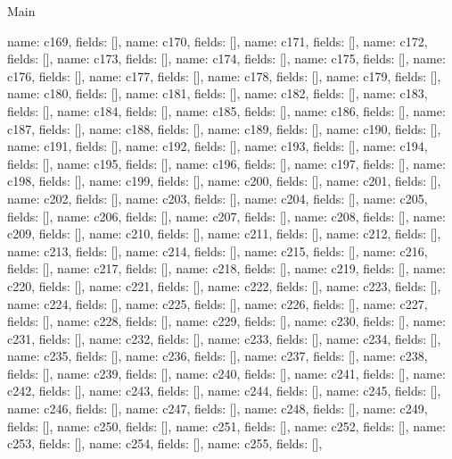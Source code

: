 \begin{lexlean}{Main}
\begin{semanticmodule}
{    {name: c169, fields: []},
    {name: c170, fields: []},
    {name: c171, fields: []},
    {name: c172, fields: []},
    {name: c173, fields: []},
    {name: c174, fields: []},
    {name: c175, fields: []},
    {name: c176, fields: []},
    {name: c177, fields: []},
    {name: c178, fields: []},
    {name: c179, fields: []},
    {name: c180, fields: []},
    {name: c181, fields: []},
    {name: c182, fields: []},
    {name: c183, fields: []},
    {name: c184, fields: []},
    {name: c185, fields: []},
    {name: c186, fields: []},
    {name: c187, fields: []},
    {name: c188, fields: []},
    {name: c189, fields: []},
    {name: c190, fields: []},
    {name: c191, fields: []},
    {name: c192, fields: []},
    {name: c193, fields: []},
    {name: c194, fields: []},
    {name: c195, fields: []},
    {name: c196, fields: []},
    {name: c197, fields: []},
    {name: c198, fields: []},
    {name: c199, fields: []},
    {name: c200, fields: []},
    {name: c201, fields: []},
    {name: c202, fields: []},
    {name: c203, fields: []},
    {name: c204, fields: []},
    {name: c205, fields: []},
    {name: c206, fields: []},
    {name: c207, fields: []},
    {name: c208, fields: []},
    {name: c209, fields: []},
    {name: c210, fields: []},
    {name: c211, fields: []},
    {name: c212, fields: []},
    {name: c213, fields: []},
    {name: c214, fields: []},
    {name: c215, fields: []},
    {name: c216, fields: []},
    {name: c217, fields: []},
    {name: c218, fields: []},
    {name: c219, fields: []},
    {name: c220, fields: []},
    {name: c221, fields: []},
    {name: c222, fields: []},
    {name: c223, fields: []},
    {name: c224, fields: []},
    {name: c225, fields: []},
    {name: c226, fields: []},
    {name: c227, fields: []},
    {name: c228, fields: []},
    {name: c229, fields: []},
    {name: c230, fields: []},
    {name: c231, fields: []},
    {name: c232, fields: []},
    {name: c233, fields: []},
    {name: c234, fields: []},
    {name: c235, fields: []},
    {name: c236, fields: []},
    {name: c237, fields: []},
    {name: c238, fields: []},
    {name: c239, fields: []},
    {name: c240, fields: []},
    {name: c241, fields: []},
    {name: c242, fields: []},
    {name: c243, fields: []},
    {name: c244, fields: []},
    {name: c245, fields: []},
    {name: c246, fields: []},
    {name: c247, fields: []},
    {name: c248, fields: []},
    {name: c249, fields: []},
    {name: c250, fields: []},
    {name: c251, fields: []},
    {name: c252, fields: []},
    {name: c253, fields: []},
    {name: c254, fields: []},
    {name: c255, fields: []},
}
\end{semanticmodule}
\end{lexlean}
